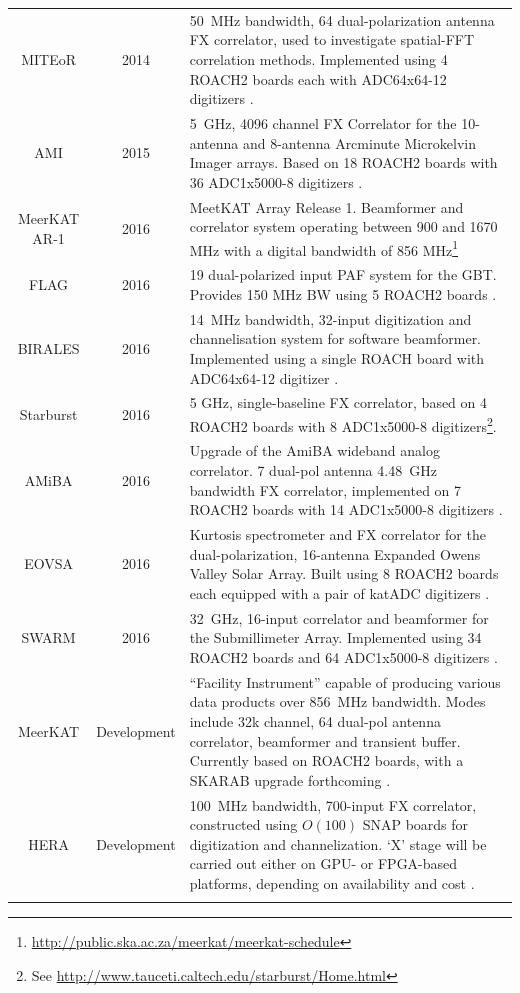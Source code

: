 \documentclass{ws-jai}
\begin{document}
\begin{longtable}{ccp{10cm}}
  MITEoR           & 2014 & 50~MHz bandwidth, 64 dual-polarization antenna FX correlator, used to investigate spatial-FFT correlation methods. Implemented using 4 ROACH2 boards each with ADC64x64-12 digitizers \citep{2014MNRAS.445.1084Z}. \\
  AMI              & 2015 & 5~GHz, 4096 channel FX Correlator for the 10-antenna and 8-antenna Arcminute Microkelvin Imager arrays. Based on 18 ROACH2 boards with 36 ADC1x5000-8 digitizers \citep{Zwart21122008, ami-digital}. \\
  MeerKAT AR-1     & 2016 & MeetKAT Array Release 1. Beamformer and correlator system operating between 900 and 1670 MHz with a digital bandwidth of 856 MHz\footnote{\url{http://public.ska.ac.za/meerkat/meerkat-schedule}} \\
  FLAG             & 2016 & 19 dual-polarized input PAF system for the GBT. Provides 150 MHz BW using 5 ROACH2 boards \citep{gb_flag, gb_beamformer}. \\
  BIRALES          & 2016 & 14~MHz bandwidth, 32-input digitization and channelisation system for software beamformer. Implemented using a single ROACH board with ADC64x64-12 digitizer \citep{7180719}. \\
  Starburst        & 2016 & 5 GHz, single-baseline FX correlator, based on 4 ROACH2 boards with 8 ADC1x5000-8 digitizers\footnote{See \url{http://www.tauceti.caltech.edu/starburst/Home.html}}. \\
  AMiBA            & 2016 & Upgrade of the AmiBA wideband analog correlator. 7 dual-pol antenna 4.48~GHz bandwidth FX correlator, implemented on 7 ROACH2 boards with 14 ADC1x5000-8 digitizers \citep{amiba-adc, amiba-interim}. \\
  EOVSA            & 2016 & Kurtosis spectrometer and FX correlator for the dual-polarization, 16-antenna Expanded Owens Valley Solar Array. Built using 8 ROACH2 boards each equipped with a pair of katADC digitizers \citep{eovsa}.\\
  SWARM            & 2016 & 32~GHz, 16-input correlator and beamformer for the Submillimeter Array. Implemented using 34 ROACH2 boards and 64 ADC1x5000-8 digitizers \citep{swarm}. \\
  MeerKAT          & Development & ``Facility Instrument'' capable of producing various data products over 856~MHz bandwidth. Modes include 32k channel, 64 dual-pol antenna correlator, beamformer and transient buffer. Currently based on ROACH2 boards, with a SKARAB upgrade forthcoming \citep{meerkat-req}. \\
  HERA             & Development & 100~MHz bandwidth, 700-input FX correlator, constructed using $O(100)$ SNAP boards for digitization and channelization. `X' stage will be carried out either on GPU- or FPGA-based platforms, depending on availability and cost \citep{2016arXiv160607473D}. \\
  \label{table:casper-instruments-correlators}

\end{longtable}
\end{document}

